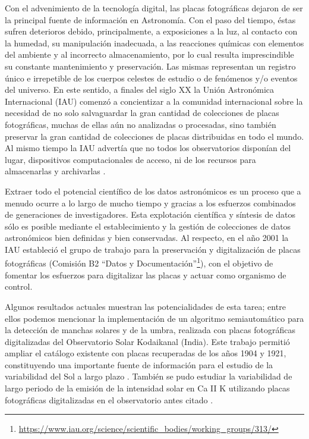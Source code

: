 \documentclass[baaa]{baaa}
\begin{document}
Con el advenimiento de la tecnología digital, las placas fotográficas dejaron de ser la principal fuente de información en Astronomía. Con el paso del tiempo, éstas sufren deterioros debido, principalmente, a exposiciones a la luz, al contacto con la humedad, su manipulación inadecuada, a las reacciones químicas con elementos del ambiente y al incorrecto almacenamiento,
por lo cual resulta imprescindible su constante mantenimiento y preservación. Las mismas representan un registro único e irrepetible de los cuerpos celestes de estudio o de fenómenos y/o eventos del universo. En este sentido, a finales del siglo XX la Unión Astronómica Internacional (IAU) comenzó a concientizar a la comunidad internacional sobre la necesidad de no solo salvaguardar la gran cantidad de colecciones de placas fotográficas, muchas de ellas aún no analizadas o procesadas, sino también preservar la gran cantidad de colecciones de placas distribuidas en todo el mundo. Al mismo tiempo la IAU  advertía que no todos los observatorios disponían del lugar, dispositivos computacionales de acceso, ni de los recursos para almacenarlas y archivarlas \citep{1992HiA.....9..727V}.

Extraer todo el potencial científico de los datos astronómicos es un proceso que a menudo ocurre a lo largo de mucho tiempo y gracias a los esfuerzos combinados de generaciones de investigadores. Esta explotación científica y síntesis de datos sólo es posible mediante el establecimiento y la gestión de colecciones de datos astronómicos bien definidas y bien conservadas. Al respecto, en el año 2001 la IAU estableció el grupo de trabajo para la preservación y digitalización de placas fotográficas
({Comisión B2 ``Datos y Documentación''}\footnote{\url{https://www.iau.org/science/scientific_bodies/working_groups/313/}}), con el objetivo de fomentar los esfuerzos para digitalizar las placas y actuar como organismo de control.

Algunos resultados actuales muestran las potencialidades de esta tarea; entre ellos podemos mencionar la implementación de un algoritmo semiautomático para la detección de manchas solares y de la umbra, realizada con placas fotográficas digitalizadas del Observatorio Solar Kodaikanal (India). Este trabajo permitió ampliar el catálogo existente con placas recuperadas de los años 1904 y 1921, constituyendo una importante fuente de información para el estudio de la variabilidad del Sol a largo plazo \citep{2022FrASS...919751J}. También se pudo estudiar la variabilidad de largo periodo de la emisión de la intensidad solar en Ca II K utilizando placas fotográficas digitalizadas en el observatorio antes citado \citep{2022ApJ...928...97K}.
\end{document}
